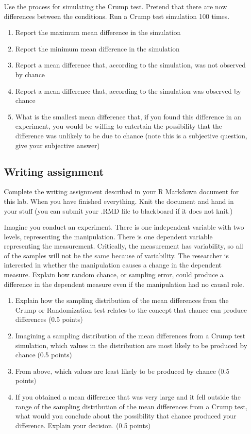 \documentclass[]{book}
\providecommand{\tightlist}{%
  \setlength{\itemsep}{0pt}\setlength{\parskip}{0pt}}
\begin{document}
Use the process for simulating the Crump test. Pretend that there are
now differences between the conditions. Run a Crump test simulation 100
times.

\begin{enumerate}
\def\labelenumi{\alph{enumi}.}
\tightlist
\item
  Report the maximum mean difference in the simulation
\item
  Report the minimum mean difference in the simulation
\item
  Report a mean difference that, according to the simulation, was not
  observed by chance
\item
  Report a mean difference that, according to the simulation was
  observed by chance
\item
  What is the smallest mean difference that, if you found this
  difference in an experiment, you would be willing to entertain the
  possibility that the difference was unlikely to be due to chance (note
  this is a subjective question, give your subjective answer)
\end{enumerate}

\subsection{Writing assignment}\label{writing-assignment-4}

Complete the writing assignment described in your R Markdown document
for this lab. When you have finished everything. Knit the document and
hand in your stuff (you can submit your .RMD file to blackboard if it
does not knit.)

Imagine you conduct an experiment. There is one independent variable
with two levels, representing the manipulation. There is one dependent
variable representing the measurement. Critically, the measurement has
variability, so all of the samples will not be the same because of
variability. The researcher is interested in whether the manipulation
causes a change in the dependent measure. Explain how random chance, or
sampling error, could produce a difference in the dependent measure even
if the manipulation had no causal role.

\begin{enumerate}
\def\labelenumi{\alph{enumi}.}
\item
  Explain how the sampling distribution of the mean differences from the
  Crump or Randomization test relates to the concept that chance can
  produce differences (0.5 points)
\item
  Imagining a sampling distribution of the mean differences from a Crump
  test simulation, which values in the distribution are most likely to
  be produced by chance (0.5 points)
\item
  From above, which values are least likely to be produced by chance
  (0.5 points)
\item
  If you obtained a mean difference that was very large and it fell
  outside the range of the sampling distribution of the mean differences
  from a Crump test, what would you conclude about the possibility that
  chance produced your difference. Explain your decision. (0.5 points)
\end{enumerate}
\end{document}
